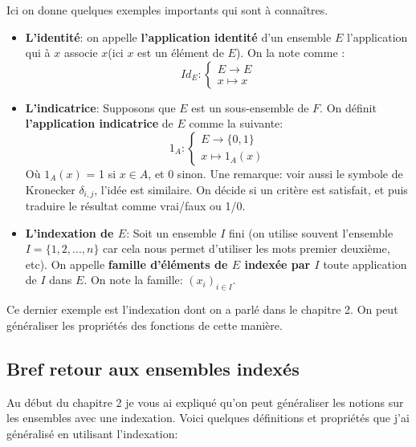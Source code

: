 \documentclass{article}
\begin{document}
Ici on donne quelques exemples importants qui sont à connaîtres.

\begin{itemize}
 \item \textbf{L'identité}: on appelle \textbf{l'application identité} d'un ensemble $E$ l'application qui à $x$ associe $x$(ici $x$ est un élément de $E$). On la note comme :
 \[
{Id}_{E} : 
\begin{cases} 
E \to E \\
x \mapsto x
\end{cases}
\]
 \item \textbf{L'indicatrice}: Supposons que $E$ est un sous-ensemble de $F$. On définit \textbf{l'application indicatrice} de $E$ comme la suivante:
 \[
{1}_{A} : 
\begin{cases} 
E \to \{0,1\} \\
x \mapsto {1}_{A}(x)
\end{cases}
\]
Où ${1}_{A}(x)$ = 1 si $x \in A$, et 0 sinon. Une remarque: voir aussi le symbole de Kronecker $\delta_{i,j}$, l'idée est similaire. On décide si un critère est satisfait, et puis traduire le résultat comme vrai/faux ou 1/0.
 \item \textbf{L'indexation de $E$}: Soit un ensemble $I$ fini (on utilise souvent l'ensemble $I = \{1,2, ... ,n\}$ car cela nous permet d'utiliser les mots premier deuxième, etc). On appelle \textbf{famille d'éléments de $E$ indexée par $I$} toute application de $I$ dans $E$. On note la famille: $(x_{i})_{i \in I}$.
\end{itemize}

Ce dernier exemple est l'indexation dont on a parlé dans le chapitre 2. On peut généraliser les propriétés des fonctions de cette manière.

\subsection{Bref retour aux ensembles indexés}

Au début du chapitre 2 je vous ai expliqué qu'on peut généraliser les notions sur les ensembles avec une indexation. Voici quelques définitions et propriétés que j'ai généralisé en utilisant l'indexation:
\end{document}
